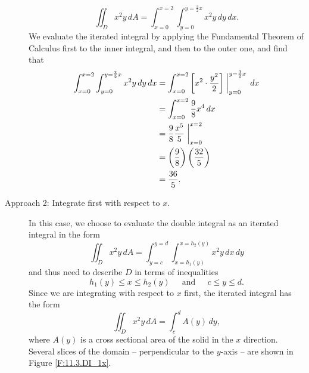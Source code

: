 \begin{example}
\begin{description}
\[\iint_D x^2y \, dA = \int_{x=0}^{x=2} \int_{y=0}^{y = \frac32 x} x^2y \, dy \, dx.\]
We evaluate the iterated integral by applying the Fundamental Theorem of Calculus first to the inner integral, and then to the outer one, and find that
\begin{align*}
\int_{x=0}^{x=2} \int_{y=0}^{y=\frac32 x} x^2y \, dy \, dx &= \int_{x=0}^{x=2} \left[x^2 \cdot \frac{y^2}{2}\right]\biggm|_{y=0}^{y=\frac32 x} \, dx \\
	&= \int_{x=0}^{x=2} \frac{9}{8}x^4\, dx \\
	&= \frac{9}{8}\frac{x^5}{5}\biggm|_{x=0}^{x=2} \\
	&= \left(\frac{9}{8}\right) \left(\frac{32}{5}\right) \\
	&= \frac{36}{5}.
\end{align*}


\item[Approach 2: Integrate first with respect to $x$.] In this case, we choose to evaluate the double integral as an iterated integral in the form
\[\iint_D x^2y \, dA = \int_{y=c}^{y=d} \int_{x=h_1(y)}^{x=h_2(y)} x^2y \, dx \, dy\]
and thus need to describe $D$ in terms of inequalities
\[h_1(y) \leq x \leq h_2(y) \ \ \ \ \ \text{ and }  \ \ \ \ \  c \leq y \leq d.\]
Since we are integrating with respect to $x$ first, the iterated integral has the form
\[ \iint_D x^2y \, dA = \int_c^d A(y) \, dy,\]
where $A(y)$ is a cross sectional area of the solid in the $x$ direction.  Several slices of the domain -- perpendicular to the $y$-axis -- are shown in Figure \ref{F:11.3.DI_1x}.


\end{description}
\end{example}
